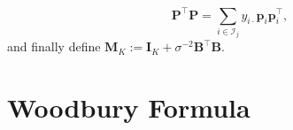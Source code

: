 \begin{equation}
    \mathbf{P}^{\top}\mathbf{P}=\sum_{i\in\mathcal{I}_{j}}y_{i\cdot}\bm{p}_{i}\bm{p}_{i}^{\top},
    \label{eq:weight-prob}
\end{equation}
and finally define $\mathbf{M}_{K}:=\mathbf{I}_{K}+\sigma^{-2}\mathbf{B}^{\top}\mathbf{B}$.

\section{Woodbury Formula}
\label{sec:woodbury}

